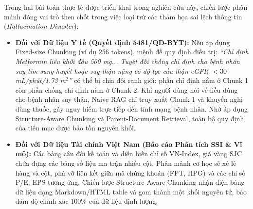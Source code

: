 \documentclass[12pt,a4paper]{report}
\begin{document}
Trong hai bài toán thực tế được triển khai trong nghiên cứu này, chiến lược phân mảnh đóng vai trò then chốt trong việc loại trừ các thảm họa sai lệch thông tin (\textit{Hallucination Disaster}):
\begin{itemize}[itemsep=2pt, parsep=0pt, topsep=3pt]
    \item \textbf{Đối với Dữ liệu Y tế (Quyết định 5481/QĐ-BYT):} Nếu áp dụng Fixed-size Chunking (ví dụ 256 tokens), mệnh đề quy định điều trị: \textit{“Chỉ định Metformin liều khởi đầu 500 mg... Tuyệt đối chống chỉ định cho bệnh nhân suy tim sung huyết hoặc suy thận nặng có độ lọc cầu thận eGFR $< 30$ mL/phút/1.73 m$^2$”} có thể bị chia đôi ranh giới: phần chỉ định nằm ở Chunk 1 còn phần chống chỉ định nằm ở Chunk 2. Khi người dùng hỏi về liều dùng cho bệnh nhân suy thận, Naive RAG chỉ truy xuất Chunk 1 và khuyến nghị dùng thuốc, gây nguy hiểm trực tiếp đến tính mạng bệnh nhân. Nhờ áp dụng Structure-Aware Chunking và Parent-Document Retrieval, toàn bộ quy định của tiểu mục được bảo tồn nguyên khối.
    \item \textbf{Đối với Dữ liệu Tài chính Việt Nam (Báo cáo Phân tích SSI \& Vĩ mô):} Các bảng cân đối kế toán và diễn biến chỉ số VN-Index, giá vàng SJC chứa đựng các bảng số liệu ma trận nhiều cột. Phân mảnh cơ học sẽ xé lẻ hàng và cột, phá vỡ liên kết giữa mã chứng khoán (FPT, HPG) và các chỉ số P/E, EPS tương ứng. Chiến lược Structure-Aware Chunking nhận diện bảng dữ liệu dạng Markdown/HTML table và gom thành một khối nguyên tử, bảo đảm độ chính xác 100\% của dữ liệu định lượng.
\end{itemize}
\end{document}
